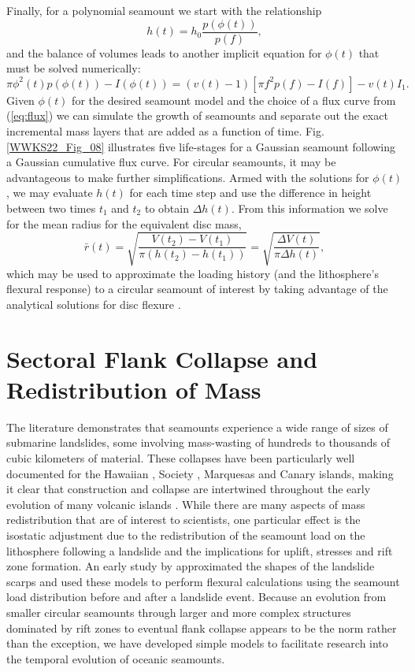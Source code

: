 Finally, for a polynomial seamount we start with the relationship
\begin{equation*}
h(t) = h_0 \frac{p(\phi(t))}{p(f)},
\end{equation*}
and the balance of volumes leads to another implicit equation for $\phi(t)$ that must be solved numerically:
\begin{equation*}
	\pi \phi^2(t) p(\phi(t)) - I(\phi(t)) = (v(t)-1) \left [\pi f^2 p(f) - I(f) \right ] - v(t) I_1.
\end{equation*}
Given $\phi(t)$ for the desired seamount model and the choice of a flux curve from (\ref{eq:flux}) we
can simulate the growth of seamounts and separate out the exact incremental mass layers that are added as a
function of time.  Fig. \ref{WWKS22_Fig_08} illustrates five life-stages for a Gaussian seamount following a
Gaussian cumulative flux curve.
For circular seamounts, it may be advantageous to make further simplifications.  Armed with the solutions
for $\phi(t)$, we may evaluate $h(t)$ for each time step and use the difference
in height between two times $t_1$ and $t_2$ to obtain $\Delta h(t)$.  From this information we solve for
the mean radius for the equivalent disc mass,
\begin{equation*}
\bar{r}(t) = \sqrt{\frac{V(t_2) - V(t_1)}{\pi \left( h(t_2) - h(t_1) \right)}} = \sqrt{\frac{\Delta V(t)}{\pi \Delta h(t)}},
\end{equation*}
which may be used to approximate the loading history (and the lithosphere's flexural response) to a circular seamount of interest
by taking advantage of the analytical solutions for disc flexure \citep{BS1969}.

\section{Sectoral Flank Collapse and Redistribution of Mass}

The literature demonstrates that seamounts experience a wide range of sizes of submarine landslides,
some involving mass-wasting of hundreds to thousands of cubic kilometers of material.  These collapses have been particularly well
documented for the Hawaiian \citep[e.g.,~][]{M1989,M1994}, Society \citep[e.g.,~][]{C2001}, Marquesas \citep[e.g.,~][]{F1994}
and Canary \citep[e.g.,~][]{WM1995,CJC1999} islands, making it clear that construction and collapse are intertwined
throughout the early evolution of many volcanic islands \citep{HJ2017,HJ2020}. While there are many aspects of mass
redistribution that are of interest to scientists, one particular effect is the isostatic adjustment due to the
redistribution of the seamount load on the lithosphere following a landslide and the implications for uplift, stresses and rift zone formation.
An early study by \citet{SW2000} approximated the shapes of the landslide scarps and used
these models to perform flexural calculations using the seamount load distribution before and after a landslide event.
Because an evolution from smaller circular seamounts through larger and more complex structures dominated by rift
zones \citep[e.g.,~][]{M2001} to eventual flank collapse appears to be the norm rather than the exception, we have developed
simple models to facilitate research into the temporal evolution of oceanic seamounts.

